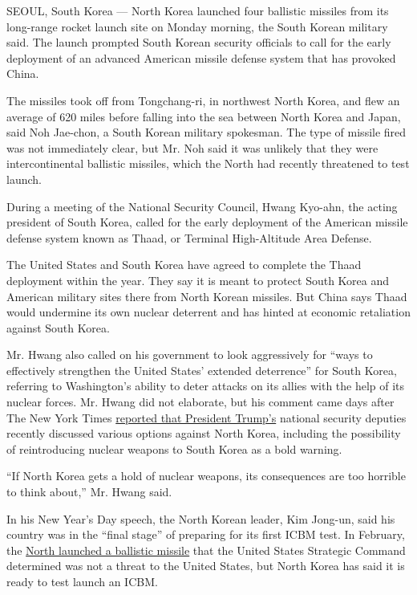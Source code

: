 SEOUL, South Korea --- North Korea launched four ballistic missiles from
its long-range rocket launch site on Monday morning, the South Korean
military said. The launch prompted South Korean security officials to
call for the early deployment of an advanced American missile defense
system that has provoked China.

The missiles took off from Tongchang-ri, in northwest North Korea, and
flew an average of 620 miles before falling into the sea between North
Korea and Japan, said Noh Jae-chon, a South Korean military spokesman.
The type of missile fired was not immediately clear, but Mr. Noh said it
was unlikely that they were intercontinental ballistic missiles, which
the North had recently threatened to test launch.

During a meeting of the National Security Council, Hwang Kyo-ahn, the
acting president of South Korea, called for the early deployment of the
American missile defense system known as Thaad, or Terminal
High-Altitude Area Defense.

The United States and South Korea have agreed to complete the Thaad
deployment within the year. They say it is meant to protect South Korea
and American military sites there from North Korean missiles. But China
says Thaad would undermine its own nuclear deterrent and has hinted at
economic retaliation against South Korea.

Mr. Hwang also called on his government to look aggressively for ``ways
to effectively strengthen the United States' extended deterrence'' for
South Korea, referring to Washington's ability to deter attacks on its
allies with the help of its nuclear forces. Mr. Hwang did not elaborate,
but his comment came days after The New York Times
\href{https://www.nytimes3xbfgragh.onion/2017/03/04/world/asia/north-korea-missile-program-sabotage.html?rref=collection\%2Fsectioncollection\%2Fasia\&action=click\&contentCollection=asia\&region=stream\&module=stream_unit\&version=latest\&contentPlacement=1\&pgtype=sectionfront\&_r=0}{reported
that President Trump's} national security deputies recently discussed
various options against North Korea, including the possibility of
reintroducing nuclear weapons to South Korea as a bold warning.

``If North Korea gets a hold of nuclear weapons, its consequences are
too horrible to think about,'' Mr. Hwang said.

In his New Year's Day speech, the North Korean leader, Kim Jong-un, said
his country was in the ``final stage'' of preparing for its first ICBM
test. In February, the
\href{https://www.nytimes3xbfgragh.onion/2017/02/11/world/asia/north-korea-missile-test-trump.html}{North
launched a ballistic missile} that the United States Strategic Command
determined was not a threat to the United States, but North Korea has
said it is ready to test launch an ICBM.

